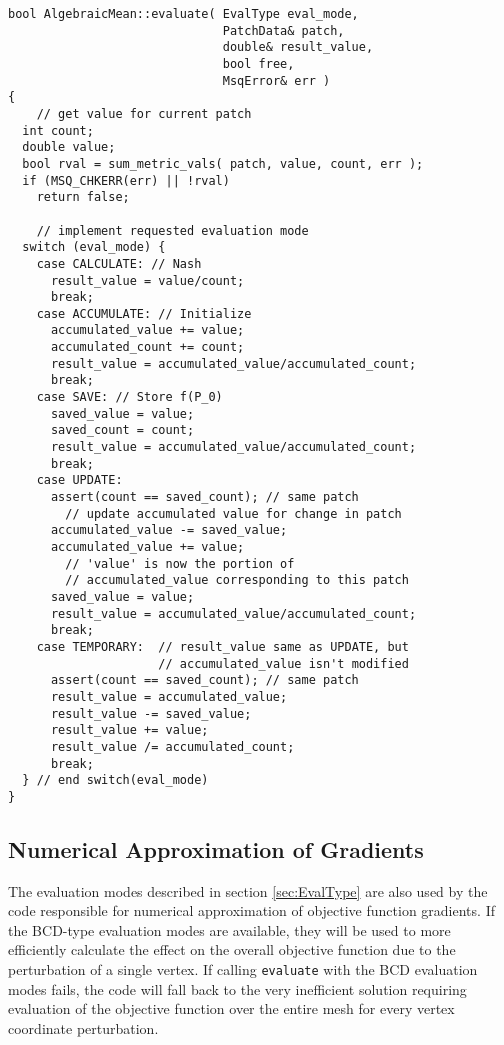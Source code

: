 \documentclass{article}
\begin{document}
\begin{lstlisting}[caption={Example of \texttt{EvalType} implementation (algebraic mean).},label={lst:evaltype-pseudo}] 
bool AlgebraicMean::evaluate( EvalType eval_mode,
                              PatchData& patch,
                              double& result_value,
                              bool free,
                              MsqError& err )
{
    // get value for current patch
  int count;
  double value;
  bool rval = sum_metric_vals( patch, value, count, err ); 
  if (MSQ_CHKERR(err) || !rval)
    return false;
  
    // implement requested evaluation mode
  switch (eval_mode) {
    case CALCULATE: // Nash
      result_value = value/count;
      break;
    case ACCUMULATE: // Initialize
      accumulated_value += value;
      accumulated_count += count;
      result_value = accumulated_value/accumulated_count;
      break;
    case SAVE: // Store f(P_0)
      saved_value = value;
      saved_count = count;
      result_value = accumulated_value/accumulated_count;
      break;
    case UPDATE: 
      assert(count == saved_count); // same patch
        // update accumulated value for change in patch
      accumulated_value -= saved_value;
      accumulated_value += value;
        // 'value' is now the portion of
        // accumulated_value corresponding to this patch
      saved_value = value;
      result_value = accumulated_value/accumulated_count;
      break;
    case TEMPORARY:  // result_value same as UPDATE, but 
                     // accumulated_value isn't modified
      assert(count == saved_count); // same patch
      result_value = accumulated_value;
      result_value -= saved_value;
      result_value += value;
      result_value /= accumulated_count;
      break;
  } // end switch(eval_mode)
}           
\end{lstlisting}

\subsection{Numerical Approximation of Gradients}

The evaluation modes described in section \ref{sec:EvalType} are also used by the code responsible for numerical approximation of objective function gradients.  If the BCD-type evaluation modes are available, they will be used to more efficiently calculate the effect on the overall objective function due to the perturbation of a single vertex.  If calling \texttt{evaluate} with the BCD evaluation modes fails, the code will fall back to the very inefficient solution requiring evaluation of the objective function over the entire mesh for every vertex coordinate perturbation.
\end{document}
